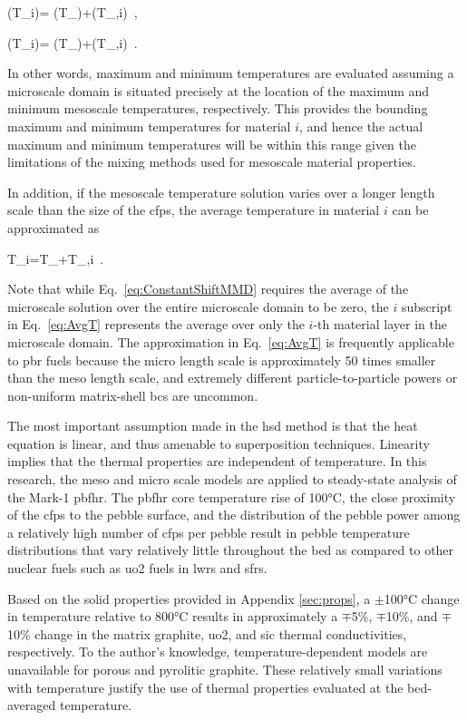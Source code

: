 \beq
\label{eq:MaxT}
\left(T_{i}\right)= \left(T_\right)+\left(T_{,i}\right)\ ,
\eeq

\beq
\label{eq:MinT}
\left(T_{i}\right)= \left(T_\right)+\left(T_{,i}\right)\ .
\eeq

\noindent In other words, maximum and minimum temperatures are evaluated assuming a microscale domain is situated precisely at the location of the maximum and minimum mesoscale temperatures, respectively. This provides the bounding maximum and minimum temperatures for material \(i\), and hence the actual maximum and minimum temperatures will be within this range given the limitations of the mixing methods used for mesoscale material properties.

In addition, if the mesoscale temperature solution varies over a longer length scale than the size of the \glspl{cfp}, the average temperature in material \(i\) can be approximated as

\beq
\label{eq:AvgT}
\la T_i\ra=\la T_\ra+\la T_{,i}\ra\ .
\eeq

\noindent Note that while Eq.\ \eqref{eq:ConstantShiftMMD} requires the average of the microscale solution over the entire microscale domain to be zero, the $i$ subscript in Eq.\ \eqref{eq:AvgT} represents the average over only the $i$-th material layer in the microscale domain. The approximation in Eq.\ \eqref{eq:AvgT} is frequently applicable to \gls{pbr} fuels because the micro length scale is approximately 50 times smaller than the meso length scale, and extremely different particle-to-particle powers or non-uniform matrix-shell \glspl{bc} are uncommon.

The most important assumption made in the \gls{hsd} method is that the heat equation is linear, and thus amenable to superposition techniques. Linearity implies that the thermal properties are independent of temperature. In this research, the meso and micro scale models are applied to steady-state analysis of the Mark-1 \gls{pbfhr}. The \gls{pbfhr} core temperature rise of 100\si{\celsius}, the close proximity of the \glspl{cfp} to the pebble surface, and the distribution of the pebble power among a relatively high number of \glspl{cfp} per pebble result in pebble temperature distributions that vary relatively little throughout the bed as compared to other nuclear fuels such as \gls{uo2} fuels in \glspl{lwr} and \glspl{sfr}. 

Based on the solid properties provided in Appendix \ref{sec:props}, a \(\pm\)100\si{\celsius} change in temperature relative to 800\si{\celsius} results in approximately a \(\mp\)5\%, \(\mp\)10\%, and \(\mp\)10\% change in the matrix graphite, \gls{uo2}, and \gls{sic} thermal conductivities, respectively. To the author's knowledge, temperature-dependent models are unavailable for porous and pyrolitic graphite. These relatively small variations with temperature justify the use of thermal properties evaluated at the bed-averaged temperature.


